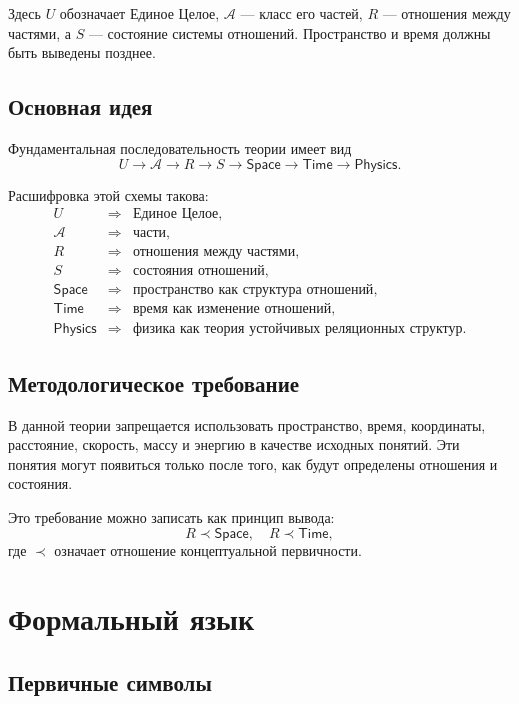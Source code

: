 \documentclass[12pt,a4paper,oneside]{book}
\theoremstyle{definition}
\theoremstyle{plain}
\theoremstyle{remark}
\newcommand{\Whole}{U}
\newcommand{\Parts}{\mathcal A}
\newcommand{\Rel}{R}
\newcommand{\State}{S}
\newcommand{\Space}{\mathsf{Space}}
\newcommand{\Time}{\mathsf{Time}}
\newcommand{\Physics}{\mathsf{Physics}}
\begin{document}
Здесь \(\Whole\) обозначает Единое Целое, \(\Parts\) --- класс его частей, \(\Rel\) --- отношения между частями, а \(\State\) --- состояние системы отношений. Пространство и время должны быть выведены позднее.

\section{Основная идея}

Фундаментальная последовательность теории имеет вид
\[
\Whole
\longrightarrow
\Parts
\longrightarrow
\Rel
\longrightarrow
\State
\longrightarrow
\Space
\longrightarrow
\Time
\longrightarrow
\Physics.
\]

Расшифровка этой схемы такова:
\[
\begin{array}{rcl}
\Whole &\Rightarrow& \text{Единое Целое},\\
\Parts &\Rightarrow& \text{части},\\
\Rel &\Rightarrow& \text{отношения между частями},\\
\State &\Rightarrow& \text{состояния отношений},\\
\Space &\Rightarrow& \text{пространство как структура отношений},\\
\Time &\Rightarrow& \text{время как изменение отношений},\\
\Physics &\Rightarrow& \text{физика как теория устойчивых реляционных структур}.
\end{array}
\]

\section{Методологическое требование}

В данной теории запрещается использовать пространство, время, координаты, расстояние, скорость, массу и энергию в качестве исходных понятий. Эти понятия могут появиться только после того, как будут определены отношения и состояния.

Это требование можно записать как принцип вывода:
\[
\Rel \prec \Space,\quad \Rel \prec \Time,
\]
где \(\prec\) означает отношение концептуальной первичности.

\chapter{Формальный язык}

\section{Первичные символы}
\end{document}
